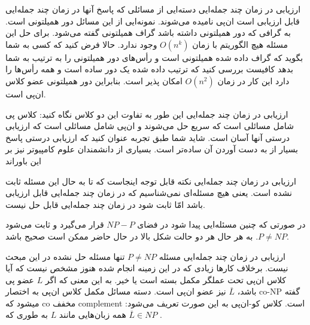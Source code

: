 \begin{itemframe}{ارزیابی در زمان چند جمله‌ایی}
\itm
دسته‌ایی از مسائلی که پاسخ آنها در زمان چند جمله‌ایی قابل ارزیابی است ان‌پی نامیده می‌شوند. نمونه‌ایی از این مسائل دور همیلتونی است. به گرافی که دور همیلتونی داشته باشد گراف همیلتونی
 گفته می‌شود.
\itm
برای حل این مسئله هیچ الگوریتم با زمان
$O(n^k)$
وجود ندارد.
\itm
حالا فرض کنید که کسی به شما بگوید که گراف داده شده همیلتونی است و رأس‌های دور همیلتونی را به ترتیب به شما بدهد کافیست بررسی کنید که ترتیب داده شده یک دور ساده است و همه رأس‌ها را دارد این کار در زمان
$O(n^2)$
امکان پذیر است. بنابراین دور همیلتونی عضو کلاس ان‌پی است.

\end{itemframe}
\begin{itemframe}{ارزیابی در زمان چند جمله‌ایی}
\itm
این طور به تفاوت این دو کلاس نگاه کنید:‌ کلاس پی شامل مسائلی است که سریع حل می‌شوند و ان‌پی شامل مسائلی است که ارزیابی درستی آنها آسان است.
\itm
شاید شما طبق تجربه عنوان کنید که ارزیابی درستی پاسخ بسیار از به دست آوردن آن ساده‌تر است. بسیاری از دانشمندان علوم کامپیوتر نیز بر این باوراند


\end{itemframe}
\begin{itemframe}{ارزیابی در زمان چند جمله‌ایی}
\itm
نکته قابل توجه اینجاست که تا به حال این مسئله ثابت نشده است. یعنی هیچ مسئله‌ای نمی‌شناسیم که در زمان چند جمله‌ایی قابل ارزیابی باشد امّا ثابت شود در زمان چند جمله‌ایی قابل حل نیست.


\itm
در صورتی که چنین مسئله‌ایی پیدا شود در فضای
$NP - P$
قرار می‌گیرد و ثابت می‌شود
$P \neq NP$.
به هر حال هر دو حالت شکل بالا در حال حاضر ممکن است صحیح باشد.
\end{itemframe}
\begin{itemframe}{ارزیابی در زمان چند جمله‌ایی}
\itm
مسئله
$P \neq NP$
تنها مسئله حل نشده در این مبحث نیست. برخلاف کار‌ها زیادی که در این زمینه انجام شده هنوز مشخص نیست که آیا کلاس ان‌پی تحت عملگر مکمل بسته است یا خیر. به این معنی که اگر
$L$
عضو پی باشد،
$\overline{L}$
نیز عضو ان‌پی است.
\itm
دسته مسائل مکمل کلاس ان‌پی به اختصار co-NP گفته میشود که co مخفف complement است.
\itm
کلاس کو-ان‌پی به این صورت تعریف می‌شود: همه زبان‌هایی مانند
$ L $
 به طوری که
$\overline{L} \in NP$ .

\end{itemframe}

